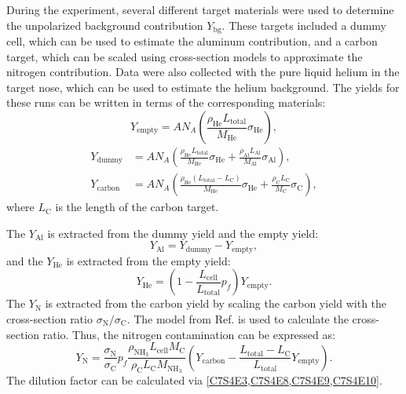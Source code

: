 During the experiment, several different target materials were used to determine the unpolarized background contribution $Y_{\mathrm{bg}}$. These targets included a dummy cell, which can be used to estimate the aluminum contribution, and a carbon target, which can be scaled using cross-section models to approximate the nitrogen contribution. Data were also collected with the pure liquid helium in the target nose, which can be used to estimate the helium background. The yields for these runs can be written in terms of the corresponding materials:
\begin{equation} \label{C7S4E5}
Y_{\mathrm{empty}} = AN_A\left(\frac{\rho_{\mathrm{He}}L_{\mathrm{total}}}{M_{\mathrm{He}}}\sigma_{\mathrm{He}}\right),
\end{equation}
\begin{align} \label{C7S4E6}
Y_{\mathrm{dummy}} & = AN_A\left(\frac{\rho_{\mathrm{He}}L_{\mathrm{total}}}{M_{\mathrm{He}}}\sigma_{\mathrm{He}}+\frac{\rho_{\mathrm{Al}}L_{\mathrm{Al}}}{M_{\mathrm{Al}}}\sigma_{\mathrm{Al}}\right), \\ \label{C7S4E7}
Y_{\mathrm{carbon}} & = AN_A\left(\frac{\rho_{\mathrm{He}}(L_{\mathrm{total}}-L_{\mathrm{C}})}{M_{\mathrm{He}}}\sigma_{\mathrm{He}}+\frac{\rho_{\mathrm{C}}L_{\mathrm{C}}}{M_{\mathrm{C}}}\sigma_{\mathrm{C}}\right),
\end{align}
where $L_{\mathrm{C}}$ is the length of the carbon target.

The $Y_{\mathrm{Al}}$ is extracted from the dummy yield and the empty yield:
\begin{equation} \label{C7S4E8}
Y_{\mathrm{Al}} = Y_{\mathrm{dummy}}-Y_{\mathrm{empty}},
\end{equation}
and the $Y_{\mathrm{He}}$ is extracted from the empty yield:
\begin{equation} \label{C7S4E9}
Y_{\mathrm{He}} = \left(1-\frac{L_{\mathrm{cell}}}{L_{\mathrm{total}}}p_f\right)Y_{\mathrm{empty}}.
\end{equation}
The $Y_{\mathrm{N}}$ is extracted from the carbon yield by scaling the carbon yield with the cross-section ratio $\sigma_{\mathrm{N}}/\sigma_{\mathrm{C}}$. The model from Ref. \cite{Bosted2008} is used to calculate the cross-section ratio. Thus, the nitrogen contamination can be expressed as:
\begin{equation} \label{C7S4E10}
Y_{\mathrm{N}} = \frac{\sigma_{\mathrm{N}}}{\sigma_{\mathrm{C}}}p_f\frac{\rho_{\mathrm{NH_3}}L_{\mathrm{cell}}M_{\mathrm{C}}}{\rho_{\mathrm{C}}L_{\mathrm{C}}M_{\mathrm{NH_3}}}\left(Y_{\mathrm{carbon}}-\frac{L_{\mathrm{total}}-L_{\mathrm{C}}}{L_{\mathrm{total}}}Y_{\mathrm{empty}}\right).
\end{equation}
The dilution factor can be calculated via \cref{C7S4E3,C7S4E8,C7S4E9,C7S4E10}.

